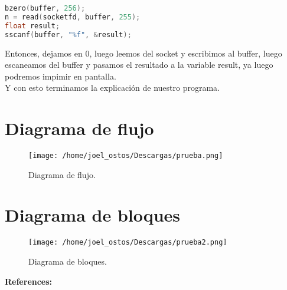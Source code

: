\documentclass{article}
\begin{document}
\begin{lstlisting}[language=C]
bzero(buffer, 256);
n = read(socketfd, buffer, 255);
float result;
sscanf(buffer, "%f", &result);
\end{lstlisting}

Entonces, dejamos en 0, luego leemos del socket y escribimos al buffer, luego escaneamos del buffer y pasamos el resultado a la variable result, ya luego podremos impimir en pantalla.\\ 
Y con esto terminamos la explicación de nuestro programa.

\section{Diagrama de flujo}
\begin{figure}[H]
\centering
\texttt{[image: /home/joel\_ostos/Descargas/prueba.png]}
\caption{Diagrama de flujo.}
\end{figure}
\section{Diagrama de bloques}
\begin{figure}[h!]
\centering
\texttt{[image: /home/joel\_ostos/Descargas/prueba2.png]}
\caption{Diagrama de bloques.}
\end{figure}

{\bf References:}



\end{document}
